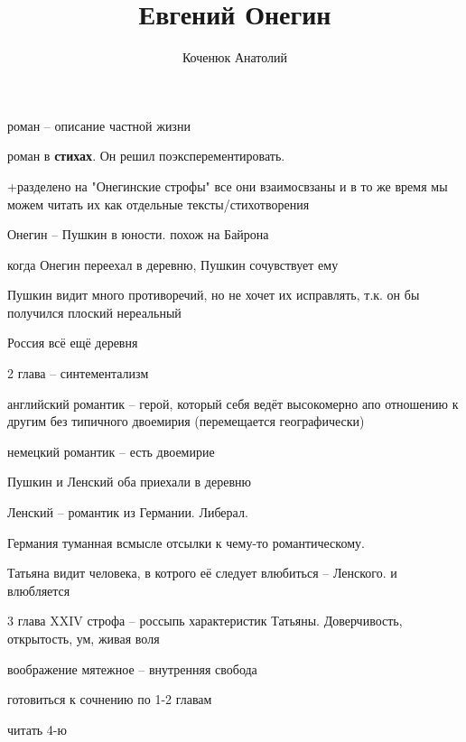 \documentclass[12pt,a4paper]{article}
\author{Коченюк Анатолий}
\title{Евгений Онегин}
\begin{document}
\maketitle

роман -- описание частной жизни

роман в \textbf{стихах}. Он решил поэксперементировать.

+разделено на "Онегинские строфы" все они взаимосвзаны и в то же время мы можем читать их как отдельные тексты/стихотворения

Онегин -- Пушкин в юности. похож на Байрона

когда Онегин переехал в деревню, Пушкин сочувствует ему

Пушкин видит много противоречий, но не хочет их исправлять, т.к. он бы получился плоский нереальный

Россия всё ещё деревня

2 глава -- синтементализм

английский романтик -- герой, который себя ведёт высокомерно апо отношению к другим без типичного двоемирия (перемещается географически)

немецкий романтик -- есть двоемирие

Пушкин и Ленский оба приехали в деревню


Ленский -- романтик из Германии. Либерал. 

Германия туманная всмысле отсылки к чему-то романтическому. 

Татьяна видит человека, в котрого её следует влюбиться -- Ленского. и влюбляется

3 глава XXIV строфа -- россыпь характеристик Татьяны. Доверчивость, открытость, ум, живая воля

воображение мятежное -- внутренняя свобода

готовиться к сочнению по 1-2 главам

читать 4-ю
\end{document}
